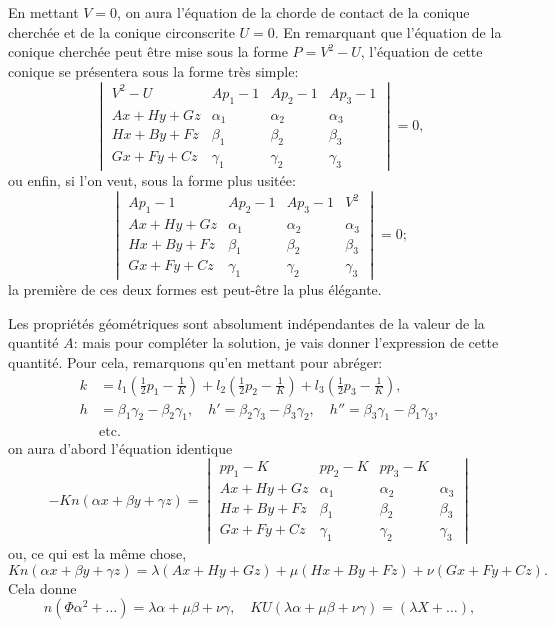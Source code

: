 \documentclass[11pt,a4paper]{book}
\begin{document}
En mettant $V = 0$, on aura l'\'{e}quation de la chorde de contact de la conique cherch\'{e}e et de la conique circonscrite $U = 0$. En remarquant que l'\'{e}quation de la conique cherch\'{e}e peut \^{e}tre mise sous la forme $P = V^2 - U$, l'\'{e}quation de cette conique se pr\'{e}sentera sous la forme tr\`{e}s simple:
\begin{equation}\tag{17}
\begin{vmatrix}
V^2 - U & Ap_1 - 1 & Ap_2 - 1 & Ap_3 - 1 \\
Ax + Hy + Gz & \alpha_1 & \alpha_2 & \alpha_3 \\
Hx + By + Fz & \beta_1 & \beta_2 & \beta_3 \\
Gx + Fy + Cz & \gamma_1 & \gamma_2 & \gamma_3
\end{vmatrix} = 0,
\end{equation}
ou enfin, si l'on veut, sous la forme plus usit\'{e}e:
\begin{equation}\tag{18}
\begin{vmatrix}
Ap_1 - 1 & Ap_2 - 1 & Ap_3 - 1 & V^2 \\
Ax + Hy + Gz & \alpha_1 & \alpha_2 & \alpha_3 \\
Hx + By + Fz & \beta_1 & \beta_2 & \beta_3 \\
Gx + Fy + Cz & \gamma_1 & \gamma_2 & \gamma_3
\end{vmatrix} = 0;
\end{equation}
la premi\`{e}re de ces deux formes est peut-\^{e}tre la plus \'{e}l\'{e}gante.

Les propri\'{e}t\'{e}s g\'{e}om\'{e}triques sont absolument ind\'{e}pendantes de la valeur de la quantit\'{e} $A$: mais pour compl\'{e}ter la solution, je vais donner l'expression de cette quantit\'{e}. Pour cela, remarquons qu'en mettant pour abr\'{e}ger:
\begin{equation}\tag{19}
\begin{aligned}
k &= l_1(\tfrac{1}{2}p_1 - \tfrac{1}{K}) + l_2(\tfrac{1}{2}p_2 - \tfrac{1}{K}) + l_3(\tfrac{1}{2}p_3 - \tfrac{1}{K}), \\
h &= \beta_1 \gamma_2 - \beta_2 \gamma_1, \quad h' = \beta_2 \gamma_3 - \beta_3 \gamma_2, \quad h'' = \beta_3 \gamma_1 - \beta_1 \gamma_3, \\
&\text{etc.}
\end{aligned}
\end{equation}
on aura d'abord l'\'{e}quation identique
\[
-Kn(\alpha x + \beta y + \gamma z) =
\begin{vmatrix}
pp_1 - K & pp_2 - K & pp_3 - K \\
Ax + Hy + Gz & \alpha_1 & \alpha_2 & \alpha_3 \\
Hx + By + Fz & \beta_1 & \beta_2 & \beta_3 \\
Gx + Fy + Cz & \gamma_1 & \gamma_2 & \gamma_3
\end{vmatrix}
\]
ou, ce qui est la m\^{e}me chose,
\[
Kn(\alpha x + \beta y + \gamma z) = \lambda(Ax + Hy + Gz) + \mu(Hx + By + Fz) + \nu(Gx + Fy + Cz).
\]
Cela donne
\[
n(\Phi \alpha^2 + \ldots) = \lambda \alpha + \mu \beta + \nu \gamma, \quad KU(\lambda \alpha + \mu \beta + \nu \gamma) = (\lambda X + \ldots),
\]
\end{document}
